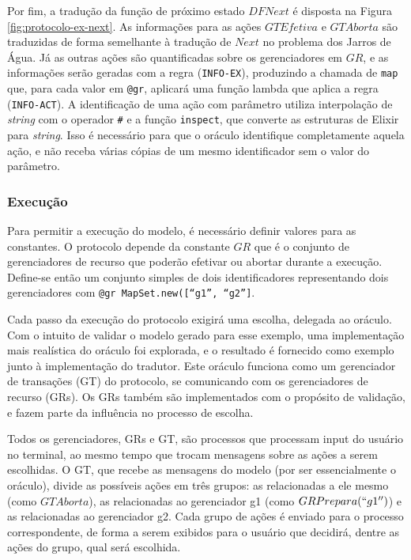 Por fim, a tradução da função de próximo estado $DFNext$ é disposta na Figura
\ref{fig:protocolo-ex-next}. As informações para as ações $GTEfetiva$ e
$GTAborta$ são traduzidas de forma semelhante à tradução de $Next$ no problema
dos Jarros de Água. Já as outras ações são quantificadas sobre os gerenciadores
em $GR$, e as informações serão geradas com a regra (\texttt{INFO-EX}),
produzindo a chamada de \texttt{map} que, para cada valor em \texttt{@gr},
aplicará uma função lambda que aplica a regra (\texttt{INFO-ACT}). A
identificação de uma ação com parâmetro utiliza interpolação de \textit{string}
com o operador \texttt{#{}} e a função \texttt{inspect}, que converte as
estruturas de Elixir para \textit{string}. Isso é necessário para que o oráculo
identifique completamente aquela ação, e não receba várias cópias de um mesmo
identificador sem o valor do parâmetro.

\subsubsection{Execução}
Para permitir a execução do modelo, é necessário definir valores para as
constantes. O protocolo depende da constante $GR$ que é o conjunto de
gerenciadores de recurso que poderão efetivar ou abortar durante a execução.
Define-se então um conjunto simples de dois identificadores representando dois
gerenciadores com \texttt{@gr MapSet.new([``g1'', ``g2'']}.

Cada passo da execução do protocolo exigirá uma escolha, delegada ao oráculo.
Com o intuito de validar o modelo gerado para esse exemplo, uma implementação
mais realística do oráculo foi explorada, e o resultado é fornecido como exemplo
junto à implementação do tradutor. Este oráculo funciona como um gerenciador de
transações (GT) do protocolo, se comunicando com os gerenciadores de recurso
(GRs). Os GRs também são implementados com o propósito de validação, e fazem
parte da influência no processo de escolha.

Todos os gerenciadores, GRs e GT, são processos que processam input do usuário
no terminal, ao mesmo tempo que trocam mensagens sobre as ações a serem
escolhidas. O GT, que recebe as mensagens do modelo (por ser essencialmente o
oráculo), divide as possíveis ações em três grupos: as relacionadas a ele mesmo
(como $GTAborta$), as relacionadas ao gerenciador g1 (como $GRPrepara(``g1'')$)
e as relacionadas ao gerenciador g2. Cada grupo de ações é enviado para o
processo correspondente, de forma a serem exibidos para o usuário que decidirá,
dentre as ações do grupo, qual será escolhida.

